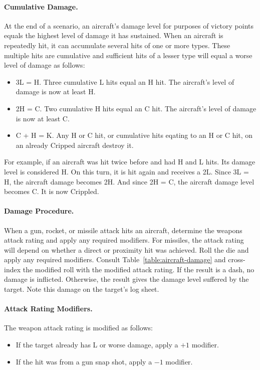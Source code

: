 {

\paragraph{Cumulative Damage.} At the end of a scenario, an aircraft's damage level for purposes of victory points equals the highest level of damage it has sustained. When an aircraft is repeatedly hit, it can accumulate several hits of one or more types. These multiple hits are cumulative and sufficient hits of a lesser type will equal a worse level of damage as follows:

\begin{itemize}
    \item 3L = H. Three cumulative L hits equal an H hit. The aircraft's level of damage is now at least H.
    \item 2H = C. Two cumulative H hits equal an C hit. The aircraft's level of damage is now at least C.
    \item C + H = K. Any H or C hit, or cumulative hits eqating to an H or C hit, on an already Cripped aircraft destroy it.
\end{itemize}

For example, if an aircraft was hit twice before and had H and L hits. Its damage level is considered H. On this turn, it is hit again and receives a 2L. Since 3L = H, the aircraft damage becomes 2H. And since 2H = C, the aircraft damage level becomes C. It is now Crippled.

}{


\paragraph{Damage Procedure.} When a gun, rocket, or missile attack hits an aircraft, determine the weapons attack rating and apply any required modifiers. For missiles, the attack rating will depend on whether a direct or proximity hit was achieved. Roll the die and apply any required modifiers. Consult Table~\ref{table:aircraft-damage} and cross-index the modified roll with the modified attack rating. If the result is a dash, no damage is inflicted. Otherwise, the result gives the damage level suffered by the target. Note this damage on the target's log sheet.

\paragraph{Attack Rating Modifiers.}
The weapon attack rating is modified as follows:
\begin{itemize}
\item If the target already has L or worse damage, apply a $+1$ modifier.
\item If the hit was from a gun snap shot, apply a $-1$ modifier.
\end{itemize}

}
